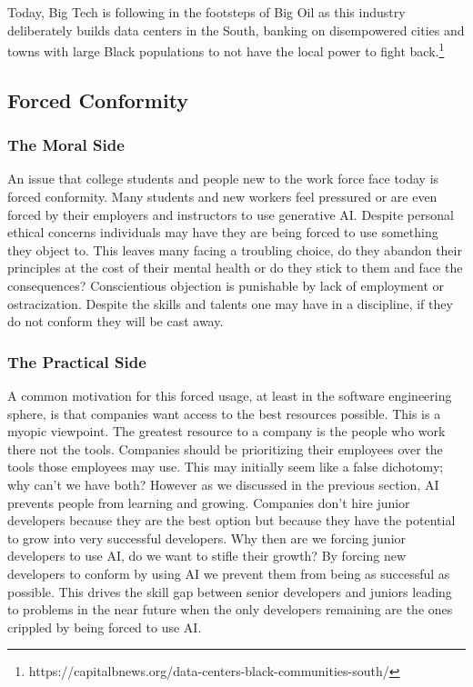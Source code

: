 \documentclass{article}[12pt]
\begin{document}
\begin{displayquote}
Today, Big Tech is following in the footsteps of Big Oil as this industry deliberately builds data centers in the South, banking on disempowered cities and towns with large Black populations to not have the local power to fight back.\footnote{https://capitalbnews.org/data-centers-black-communities-south/}
\end{displayquote}

\subsection{Forced Conformity}
\subsubsection{The Moral Side}
An issue that college students and people new to the work force face today is forced conformity. Many students and new workers feel pressured or are even forced by their employers and instructors to use generative AI. Despite personal ethical concerns individuals may have they are being forced to use something they object to. This leaves many facing a troubling choice, do they abandon their principles at the cost of their mental health or do they stick to them and face the consequences? Conscientious objection is punishable by lack of employment or ostracization. Despite the skills and talents one may have in a discipline, if they do not conform they will be cast away.

\subsubsection{The Practical Side}
A common motivation for this forced usage, at least in the software engineering sphere, is that companies want access to the best resources possible. This is a myopic viewpoint. The greatest resource to a company is the people who work there not the tools. Companies should be prioritizing their employees over the tools those employees may use. This may initially seem like a false dichotomy; why can't we have both? However as we discussed in the previous section, AI prevents people from learning and growing. Companies don't hire junior developers because they are the best option but because they have the potential to grow into very successful developers. Why then are we forcing junior developers to use AI, do we want to stifle their growth? By forcing new developers to conform by using AI we prevent them from being as successful as possible. This drives the skill gap between senior developers and juniors leading to problems in the near future when the only developers remaining are the ones crippled by being forced to use AI.
\end{document}
